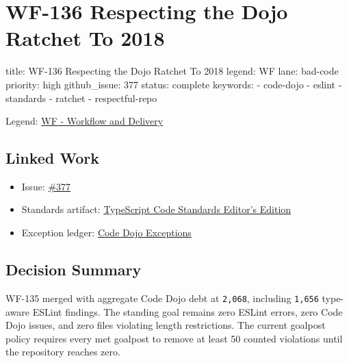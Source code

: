 \chapter{WF-136 Respecting the Dojo Ratchet To 2018}\label{record-218}

\smallskip

\begin{RecordMeta}
title: WF-136 Respecting the Dojo Ratchet To 2018
legend: WF
lane: bad-code
priority: high
github_issue: 377
status: complete
keywords:
  - code-dojo
  - eslint
  - standards
  - ratchet
  - respectful-repo

\end{RecordMeta}

Legend: \href{https://github.com/flyingrobots/bijou/blob/cbd70612140e7a450d764b3c7be1c6af878b99bc/docs/legends/WF-workflow-delivery.md}{WF - Workflow and Delivery}

\section{Linked Work}\label{record-218-linked-work}

\begin{itemize}
\tightlist
\item
  Issue: \href{https://github.com/flyingrobots/bijou/issues/377}{\#377}
\item
  Standards artifact: \href{https://github.com/flyingrobots/bijou/blob/cbd70612140e7a450d764b3c7be1c6af878b99bc/docs/typescript-code-standards.editors-edition.md}{TypeScript Code Standards Editor's Edition}
\item
  Exception ledger: \href{https://github.com/flyingrobots/bijou/blob/cbd70612140e7a450d764b3c7be1c6af878b99bc/docs/code-dojo-exceptions.md}{Code Dojo Exceptions}
\end{itemize}

\section{Decision Summary}\label{record-218-decision-summary}

WF-135 merged with aggregate Code Dojo debt at \texttt{2\allowbreak{},\allowbreak{}0\allowbreak{}6\allowbreak{}8}, including \texttt{1\allowbreak{},\allowbreak{}6\allowbreak{}5\allowbreak{}6} type-aware ESLint findings. The standing goal remains zero ESLint errors, zero Code Dojo issues, and zero files violating length restrictions. The current goalpost policy requires every met goalpost to remove at least 50 counted violations until the repository reaches zero.

